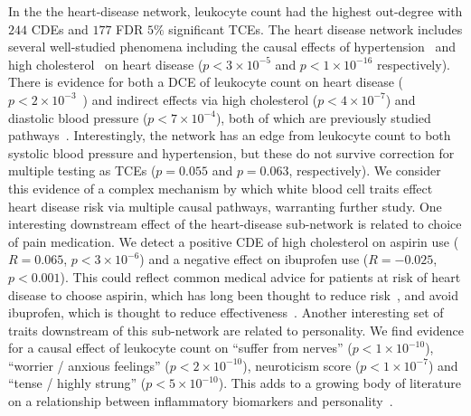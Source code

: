 \documentclass{article}
\begin{document}
In the the heart-disease network, leukocyte count had the highest out-degree with $244$ CDEs
and $177$ FDR $5\%$ significant TCEs. The heart disease network includes several well-studied phenomena
including the causal effects of hypertension~\cite{MacMahon1990} and high cholesterol~\cite{Castelli1992}
on heart disease ($p < 3 \times 10^{-5}$ and $p < 1 \times 10^{-16}$ respectively). There is 
evidence for both a DCE of leukocyte count on heart disease
($p < 2 \times 10^{-3}$~\cite{Lee2001})
and indirect effects via high cholesterol ($p < 4 \times 10^{-7}$) and diastolic blood pressure
($p < 7 \times 10^{-4}$), both of which are previously studied pathways~\cite{Facchini1992}.
Interestingly, the network has an edge from
leukocyte count to both systolic blood pressure and hypertension, but these do not survive correction
for multiple testing as TCEs ($p = 0.055$ and $p = 0.063$, respectively). We consider this evidence of
a complex mechanism by which white blood cell traits effect heart disease risk via multiple causal pathways,
warranting further study. One interesting downstream effect of the heart-disease sub-network is related
to choice of pain medication. We detect a positive CDE of high cholesterol on aspirin use
($R = 0.065$, $p < 3 \times 10^{-6}$) and a negative effect on ibuprofen use ($R = -0.025$, $p < 0.001$).
This could reflect common medical advice for patients at risk of heart disease to choose aspirin,
which has long been thought to reduce risk~\cite{Sanmuganathan2001}, and avoid ibuprofen, which
is thought to reduce effectiveness~\cite{MacDonald2006}. Another interesting set of traits
downstream of this sub-network are related to personality. We find evidence for a causal effect of
leukocyte count on ``suffer from nerves'' ($p < 1 \times 10^{-10}$), ``worrier / anxious feelings'' 
($p < 2 \times 10^{-10}$), neuroticism score ($p < 1 \times 10^{-7}$) and ``tense / highly strung''
($p < 5 \times 10^{-10}$). This adds to a growing body of literature on a relationship between
inflammatory biomarkers and personality~\cite{Allen2017,Sutin2012}.
\end{document}

